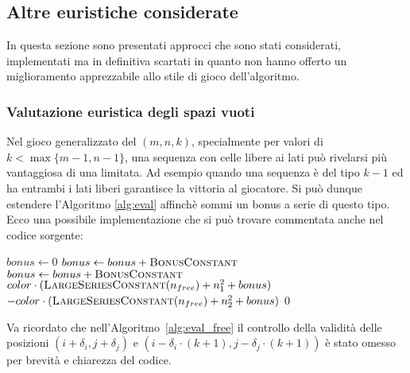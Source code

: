 \documentclass{article}
\begin{document}
\subsection{Altre euristiche considerate}

In questa sezione sono presentati approcci che sono stati considerati,
implementati ma in definitiva scartati in quanto non hanno offerto un
miglioramento apprezzabile allo stile di gioco dell'algoritmo.

\subsubsection{Valutazione euristica degli spazi vuoti}

Nel gioco generalizzato del $(m, n, k)$, specialmente per valori di $k < \max\{m-1,n-1\}$,
una sequenza con celle libere ai lati pu\`o rivelarsi pi\`u vantaggiosa di una
limitata. Ad esempio quando una sequenza \`e del tipo $k-1$ ed ha entrambi i lati liberi
garantisce la vittoria al giocatore. Si pu\`o dunque estendere l'Algoritmo
\vref{alg:eval} affinch\`e sommi un bonus a serie di questo tipo.
Ecco una possibile implementazione che si pu\`o trovare
commentata anche nel codice sorgente:

\begin{algorithm}[H]
  \caption{Valutazione delle serie favorendo spazi liberi adiacenti}
  \label{alg:eval_free}
  \begin{algorithmic}[0]
    \State {}
    \State $bonus \gets 0$
      \State $bonus \gets bonus + \textsc{BonusConstant}$
    \EndIf
      \State $bonus \gets bonus + \textsc{BonusConstant}$
    \EndIf
    \Statex
      \State \Return $color \cdot (\Call{LargeSeriesConstant}{n_{free}} + n_1^2 + bonus)$
    \State \Return $-color \cdot (\Call{LargeSeriesConstant}{n_{free}} + n_2^2 + bonus)$
    \Else
      \State \Return $0$
    \EndIf
    \EndProcedure
  \end{algorithmic}
\end{algorithm}

Va ricordato che nell'Algoritmo~\ref{alg:eval_free} il controllo della validit\`a delle
posizioni $(i + \delta_i, j + \delta_j)$ e $(i - \delta_i \cdot (k+1), j - \delta_j \cdot (k+1))$
\`e stato omesso per brevit\`a e chiarezza del codice.
\end{document}
